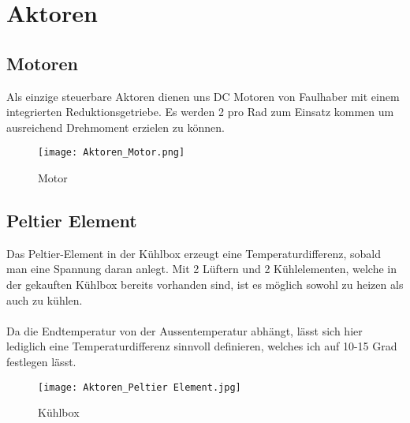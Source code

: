 \section{Aktoren}

\subsection{Motoren}
Als einzige steuerbare Aktoren dienen uns DC Motoren von Faulhaber mit einem integrierten Reduktionsgetriebe. Es werden 2 pro Rad zum Einsatz kommen um ausreichend Drehmoment erzielen zu können.

\begin{figure}[H]
    \begin{center}
    \texttt{[image: Aktoren\_Motor.png]}
    \end{center}
    \caption{Motor}
\end{figure}

\subsection{Peltier Element}
Das Peltier-Element in der Kühlbox erzeugt eine Temperaturdifferenz, sobald man eine Spannung daran anlegt. Mit 2 Lüftern und 2 Kühlelementen, welche in der gekauften Kühlbox bereits vorhanden sind, ist es möglich sowohl zu heizen als auch zu kühlen. \\
\\
Da die Endtemperatur von der Aussentemperatur abhängt, lässt sich hier lediglich eine Temperaturdifferenz sinnvoll definieren, welches ich auf 10-15 Grad festlegen lässt.
\begin{figure}[H]
    \begin{center}
    \texttt{[image: Aktoren\_Peltier Element.jpg]}
    \end{center}
    \caption{Kühlbox}
\end{figure}